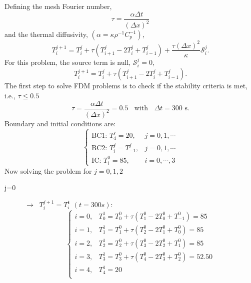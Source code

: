 \documentclass[calculator,datasheet,handbook,solutions]{exam}
\begin{document}
\begin{question}
\begin{enumerate}
\begin{enumerate}[a)]
{          Defining the mesh Fourier number,
          \begin{displaymath}
            \tau = \frac{\alpha \Delta t}{\left(\Delta x\right)^{2}}
          \end{displaymath}
          and the thermal diffusivity, $\left(\alpha=\kappa\rho^{-1}C_{p}^{-1}\right)$,
          \begin{displaymath}
            T_{i}^{j+1} = T_{i}^{j} + \tau\left(T_{i+1}^{j} - 2T_{i}^{j}+T_{i-1}^{j}\right) + \frac{\tau\left(\Delta x\right)^{2}}{\kappa}\mathcal{S}_{i}^{j}.
          \end{displaymath}
          For this problem, the source term is null, $\mathcal{S}_{i}^{j}=0$, ~
          \begin{displaymath}
            T_{i}^{j+1} = T_{i}^{j} + \tau\left(T_{i+1}^{j} - 2T_{i}^{j}+T_{i-1}^{j}\right).
          \end{displaymath}
          The first step to solve FDM problems is to check if the stability criteria is met, i.e., $\tau \le 0.5$
          \begin{displaymath}
            \tau = \frac{\alpha \Delta t}{\left(\Delta x\right)^{2}} = 0.5 \;\;\text{ with }\;\;\Delta t = 300\text{ s}.
          \end{displaymath}
          Boundary and initial conditions are:
          \begin{displaymath}
            \begin{cases}
               \text{BC1: } T_{4}^{j} = 20, & j = 0,1,\cdots \\
               \text{BC2: } T_{i}^{j} = T_{-1}^{j}, & j = 0,1,\cdots \\
               \text{IC: } T_{i}^{0} = 85, & i = 0,\cdots, 3 
            \end{cases}
          \end{displaymath}
          Now solving the problem for $j=0,1,2$
          \begin{description}
            \item[j=0] $\rightarrow\;\;T_{i}^{j+1}=T_{i}^{1}$ $\left(t=300 s\right)$:
              \begin{displaymath}
                \begin{cases}
                   i=0, & T_{0}^{1} = T_{0}^{0} + \tau\left(T_{1}^{0}-2T_{0}^{0}+T_{-1}^{0}\right) = 85 \\
                   i=1, & T_{1}^{1} = T_{1}^{0} + \tau\left(T_{2}^{0}-2T_{1}^{0}+T_{0}^{0}\right) = 85 \\
                   i=2, & T_{2}^{1} = T_{2}^{0} + \tau\left(T_{3}^{0}-2T_{2}^{0}+T_{1}^{0}\right) = 85 \\
                   i=3, & T_{3}^{1} = T_{3}^{0} + \tau\left(T_{4}^{0}-2T_{3}^{0}+T_{2}^{0}\right) = 52.50 \\
                   i=4, & T_{4}^{1} = 20 \\
                \end{cases}
              \end{displaymath}
              

\end{description}}
\end{enumerate}
\end{enumerate}
\end{question}
\end{document}
